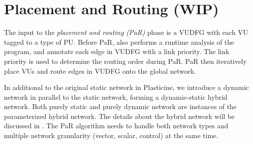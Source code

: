 \section{Placement and Routing (WIP)} \label{sec:mapping}
The input to the \emph{placement and routing (PaR)} phase is a VUDFG with each VU tagged to a type of PU.
Before PaR, \name also performs a runtime analysis of the program, and annotate each edge in VUDFG
with a link priority. The link priority is used to determine the routing order during PaR.
PaR then iteratively place VUs and route edges in VUDFG onto the global network.

In additional to the original static network in Plasticine, we introduce a dynamic network in
parallel to the static network, forming a dynamic-static hybrid network.
Both purely static and purely dynamic network are instances of the parameterized hybrid network.
The details about the hybrid network will be discussed in .
The PaR algorithm needs to handle both network types and multiple network granularity (vector,
scalar, control) at the same time.

